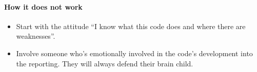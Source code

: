 \paragraph*{How it does not work}

\begin{itemize}[noitemsep]
  \item[$\boxminus$] Start with the attitude ``I know what this code does and
  where there are weaknesses''.
  \item[$\boxminus$] Involve someone who's emotionally involved in the code's
  development into the reporting. They will always defend their brain child.
\end{itemize}

